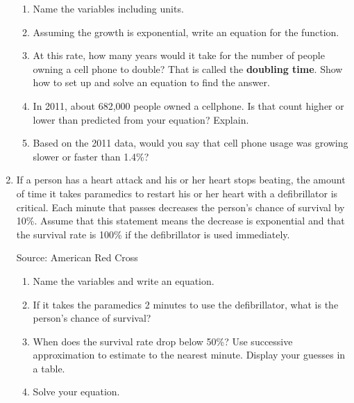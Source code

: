 \begin{enumerate}
\begin{enumerate}
\item Name the variables including units.  \vfill
\item Assuming the growth is exponential, write an equation for the function.  \vfill
\item At this rate, how many years would it take for the number of people owning a cell phone to double?  That is called the  \textbf{doubling time}.  Show how to set up and solve an equation to find the answer.  \vfill   \vfill
\item In 2011, about 682,000 people owned a cellphone.  Is that count higher or lower than predicted from your equation?  Explain.  \vfill
\item Based on the 2011 data, would you say that cell phone usage was growing slower or faster than 1.4\%?  \vfill
\end{enumerate}

\newpage %

\item  If a person has a heart attack and his or her heart stops beating, the amount of time it takes paramedics to restart his or her heart with a defibrillator is critical.  Each minute that passes decreases the person's chance of survival by 10\%.  Assume that this statement means the decrease is exponential and that the survival rate is 100\% if the defibrillator is used immediately. \hfill \begin{footnotesize} Source: American Red Cross \end{footnotesize}
\begin{enumerate}
\item Name the variables and write an equation. \vfill
\item If it takes the paramedics 2 minutes to use the defibrillator, what is the person's chance of survival? \vfill
\item When does the survival rate drop below 50\%? Use successive approximation to estimate to the nearest minute.  Display your guesses in a table. \vfill \vfill
\item Solve your equation. \vfill \vfill
\end{enumerate}  

\newpage %


\end{enumerate}
